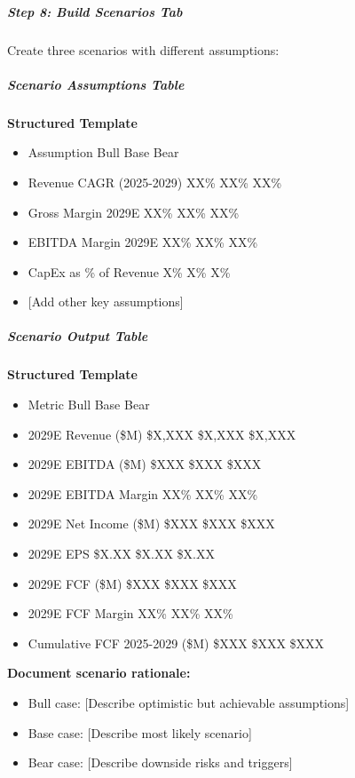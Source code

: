 \documentclass[11pt]{article}
\begin{document}
\subparagraph{Step 8: Build Scenarios Tab}\mbox{}\par

Create three scenarios with different assumptions:


\subparagraph{Scenario Assumptions Table}\mbox{}\par
\textbf{Structured Template}
\begin{itemize}[leftmargin=*,itemsep=2pt,topsep=2pt]
\item {} Assumption Bull Base Bear
\item {} Revenue CAGR (2025-2029) XX\% XX\% XX\%
\item {} Gross Margin 2029E XX\% XX\% XX\%
\item {} EBITDA Margin 2029E XX\% XX\% XX\%
\item {} CapEx as \% of Revenue X\% X\% X\%
\item {} [Add other key assumptions]
\end{itemize}

\subparagraph{Scenario Output Table}\mbox{}\par
\textbf{Structured Template}
\begin{itemize}[leftmargin=*,itemsep=2pt,topsep=2pt]
\item {} Metric Bull Base Bear
\item {} 2029E Revenue (\$M) \$X,XXX \$X,XXX \$X,XXX
\item {} 2029E EBITDA (\$M) \$XXX \$XXX \$XXX
\item {} 2029E EBITDA Margin XX\% XX\% XX\%
\item {} 2029E Net Income (\$M) \$XXX \$XXX \$XXX
\item {} 2029E EPS \$X.XX \$X.XX \$X.XX
\item {} 2029E FCF (\$M) \$XXX \$XXX \$XXX
\item {} 2029E FCF Margin XX\% XX\% XX\%
\item {} Cumulative FCF 2025-2029 (\$M) \$XXX \$XXX \$XXX
\end{itemize}

\textbf{Document scenario rationale:}

\begin{itemize}[leftmargin=*,itemsep=2pt,topsep=2pt]
\item {} Bull case: [Describe optimistic but achievable assumptions]
\item {} Base case: [Describe most likely scenario]
\item {} Bear case: [Describe downside risks and triggers]
\end{itemize}
\end{document}
